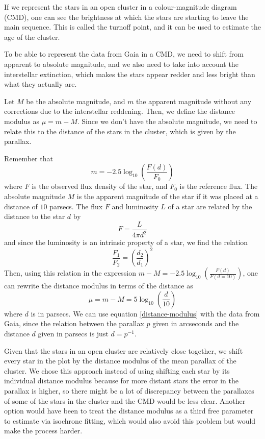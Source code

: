\documentclass[twocolumn]{revtex4}
\begin{document}
If we represent the stars in an open cluster in a colour-magnitude diagram (CMD), one can see the brightness at which the stars are starting to leave the main sequence. This is called the turnoff point, and it can be used to estimate the age of the cluster.

To be able to represent the data from Gaia in a CMD, we need to shift from apparent to absolute magnitude, and we also need to take into account the interstellar extinction, which makes the stars appear redder and less bright than what they actually are.

Let $M$ be the absolute magnitude, and $m$ the apparent magnitude without any corrections due to the interstellar reddening. Then, we define the distance modulus as $\mu = m - M$. Since we don't have the absolute magnitude, we need to relate this to the distance of the stars in the cluster, which is given by the parallax.

Remember that
\[m = -2.5 \log_{10} \left( \frac{F(d)}{F_0} \right) \]
where $F$ is the observed flux density of the star, and $F_0$ is the reference flux.
The absolute magnitude $M$ is the apparent magnitude of the star if it was placed at a distance of $10$ parsecs. The flux $F$ and luminosity $L$ of a star are related by the distance to the star $d$ by
\[F = \frac{L}{4 \pi d^2}\]
and since the luminosity is an intrinsic property of a star, we find the relation
\begin{equation}
\frac{F_1}{F_2} = \left( \frac{d_2}{d_1} \right)^2
\end{equation}
Then, using this relation in the expression $m - M = -2.5 \log_{10} \left( \frac{F(d)}{F(d=10)} \right)$, one can rewrite the distance modulus in terms of the distance as
\begin{equation}
\label{distance-modulus}
\mu = m - M = 5 \log_{10} \left( \frac{d}{10} \right)
\end{equation}
where $d$ is in parsecs. We can use equation \ref{distance-modulus} with the data from Gaia, since the relation between the parallax $p$ given in arcseconds and the distance $d$ given in parsecs is just $d = p^{-1}$.

Given that the stars in an open cluster are relatively close together, we shift every star in the plot by the distance modulus of the mean parallax of the cluster. We chose this approach instead of using shifting each star by its individual distance modulus because for more distant stars the error in the parallax is higher, so there might be a lot of discrepancy between the parallaxes of some of the stars in the cluster and the CMD would be less clear. Another option would have been to treat the distance modulus as a third free parameter to estimate via isochrone fitting, which would also avoid this problem but would make the process harder.
\end{document}
